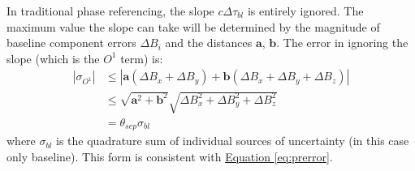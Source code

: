 		In traditional phase referencing, the slope $c\Delta\tau_{bl}$ is entirely ignored. The maximum value the slope can take will be determined by the magnitude of baseline component errors $\Delta B_i$ and the distances $\textbf{a}$, $\textbf{b}$. The error in ignoring the slope (which is the $O^1$ term) is:
		\begin{equation}
		\begin{split}
		|\sigma_{O^1}|&\le|\textbf{a}\left(\Delta B_x + \Delta B_y\right) + \textbf{b}\left(\Delta B_x + \Delta B_y + \Delta B_z\right)| \\
		                  &\le\sqrt{\textbf{a}^2 + \textbf{b}^2} \sqrt{\Delta B_x^2 + \Delta B_y^2 + \Delta B_z^2} \\
		                  &= \theta_{sep}\sigma_{bl}
		\end{split}
		\end{equation} where $\sigma_{bl}$ is the quadrature sum of individual sources of uncertainty (in this case only baseline). This form is consistent with \hyperref[eq:prerror]{Equation \ref*{eq:prerror}}.
		
